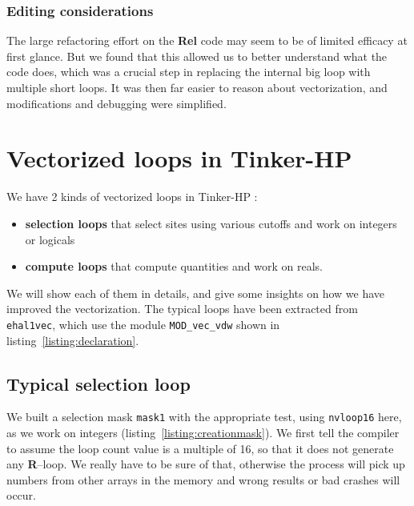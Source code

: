 \documentclass[9pt,comparison]{livecoms}
\newcommand{\lv}{\Large\verb}
\begin{document}
\subsubsection{Editing considerations}
\hspace{\parindent}The large refactoring effort on the {\bf Rel} code may seem to be of limited efficacy at first glance. But we found that this allowed us to better understand what the code does, which was a crucial step in replacing the internal big loop with multiple short loops. It was then far easier to reason about vectorization, and modifications and debugging were simplified.

\section{Vectorized loops in Tinker-HP}
\hspace{\parindent}We have 2 kinds of vectorized loops in Tinker-HP :
\begin{itemize}
    \item \textbf{selection loops}
that select sites using various cutoffs and work on integers or logicals \item\textbf{compute loops} that compute quantities and work on reals. \end{itemize}

We will show each of them in details, and give some insights on how we have improved the vectorization. The typical loops have been extracted from {\color{codepurple}\lv|ehal1vec|}, which use the module {\color{codepurple}\lv|MOD_vec_vdw|} shown in listing~\ref{listing:declaration}.
\subsection{Typical selection loop}

\hspace{\parindent}We built a selection mask {\color{blue}\lv|mask1|} with the appropriate test, using {\color{blue}\lv|nvloop16|} here, as we work on integers (listing~\ref{listing:creationmask}). 
We first tell the compiler to assume the loop count value is a multiple of 16, so that it does not generate any \textbf{R}--loop. We really have to be sure of that, otherwise the process will pick up numbers from other arrays in the memory and wrong results or bad crashes will occur. 

\end{document}
